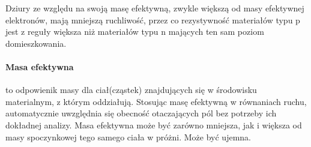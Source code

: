 \documentclass{article}
\begin{document}
            Dziury ze względu na swoją masę efektywną, zwykle większą
            od masy efektywnej elektronów, mają mniejszą ruchliwość,
            przez co rezystywność materiałów typu p jest z reguły większa
            niż materiałów typu n mających ten sam poziom domieszkowania.

            \paragraph{Masa efektywna}
            to odpowienik masy dla ciał(cząstek) znajdujących się w środowisku
            materialnym, z którym oddziałują. Stosując masę efektywną w równaniach
            ruchu, automatycznie uwzględnia się obecność otaczających pól
            bez potrzeby ich dokładnej analizy. Masa efektywna może być zarówno
            mniejsza, jak i większa od masy spoczynkowej tego samego ciała
            w próżni. Może być ujemna.
\end{document}
